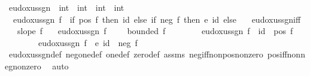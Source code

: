 \begin{isabellebody}
\isamarkupfalse%
\ eudoxus{\isacharunderscore}{\kern0pt}sgn\ {\isacharcolon}{\kern0pt}{\isacharcolon}{\kern0pt}\ {\isachardoublequoteopen}{\isacharparenleft}{\kern0pt}int\ {\isasymRightarrow}\ int{\isacharparenright}{\kern0pt}\ {\isasymRightarrow}\ {\isacharparenleft}{\kern0pt}int\ {\isasymRightarrow}\ int{\isacharparenright}{\kern0pt}{\isachardoublequoteclose}\ \ \isanewline
\ \ {\isachardoublequoteopen}eudoxus{\isacharunderscore}{\kern0pt}sgn\ f\ {\isacharequal}{\kern0pt}\ {\isacharparenleft}{\kern0pt}if\ pos\ f\ then\ id\ else\ if\ neg\ f\ then\ {\isacharminus}{\kern0pt}\isactrlsub e\ id\ else\ {\isacharparenleft}{\kern0pt}{\isasymlambda}{\isacharunderscore}{\kern0pt}{\isachardot}{\kern0pt}\ {}{\isacharparenright}{\kern0pt}{\isacharparenright}{\kern0pt}{\isachardoublequoteclose}\isanewline
\isanewline
{}\isamarkupfalse%
\ eudoxus{\isacharunderscore}{\kern0pt}sgn{\isacharunderscore}{\kern0pt}iff{\isacharcolon}{\kern0pt}\isanewline
\ \ \ {\isachardoublequoteopen}slope\ f{\isachardoublequoteclose}\isanewline
\ \ \ {\isachardoublequoteopen}eudoxus{\isacharunderscore}{\kern0pt}sgn\ f\ {\isacharequal}{\kern0pt}\ {\isacharparenleft}{\kern0pt}{\isasymlambda}{\isacharunderscore}{\kern0pt}{\isachardot}{\kern0pt}\ {}{\isacharparenright}{\kern0pt}\ {\isasymlongleftrightarrow}\ bounded\ f{\isachardoublequoteclose}\isanewline
\ \ \ \ \ \ \ \ {\isachardoublequoteopen}eudoxus{\isacharunderscore}{\kern0pt}sgn\ f\ {\isacharequal}{\kern0pt}\ id\ {\isasymlongleftrightarrow}\ pos\ f{\isachardoublequoteclose}\isanewline
\ \ \ \ \ \ \ \ {\isachardoublequoteopen}eudoxus{\isacharunderscore}{\kern0pt}sgn\ f\ {\isacharequal}{\kern0pt}\ {\isacharparenleft}{\kern0pt}{\isacharminus}{\kern0pt}\isactrlsub e\ id{\isacharparenright}{\kern0pt}\ {\isasymlongleftrightarrow}\ neg\ f{\isachardoublequoteclose}\ \isanewline
%
\isadelimproof
\ \ %
\endisadelimproof
%
\isatagproof
{}\isamarkupfalse%
\ eudoxus{\isacharunderscore}{\kern0pt}sgn{\isacharunderscore}{\kern0pt}def\ neg{\isacharunderscore}{\kern0pt}one{\isacharunderscore}{\kern0pt}def\ one{\isacharunderscore}{\kern0pt}def\ zero{\isacharunderscore}{\kern0pt}def\ assms\ neg{\isacharunderscore}{\kern0pt}iff{\isacharunderscore}{\kern0pt}nonpos{\isacharunderscore}{\kern0pt}nonzero\ pos{\isacharunderscore}{\kern0pt}iff{\isacharunderscore}{\kern0pt}nonneg{\isacharunderscore}{\kern0pt}nonzero\ \isamarkupfalse%
\ auto%
\endisatagproof
{\isafoldproof}%
%
\isadelimproof
\isanewline
%
\endisadelimproof

\end{isabellebody}
